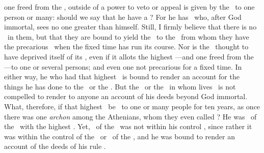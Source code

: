 \documentclass[12pt,twoside]{memoir}
\begin{document}
one freed from the \leges, outside of
a power to veto or appeal is given by the \populus\ to one person or
many: should we say that he  have a \iusmaiestatis?
For he has \maiestas\ who, after God immortal, sees no one greater
than himself.  Still, I firmly believe  that there is
no \maiestas\ in them, but that they are bound to yield
 the \imperium\ to the \populus\ from whom they have
the precarious \potestas\ when the fixed time has run its
course. %
Nor is the \populus\ thought to have deprived itself of its \potestas,
even if it allots the highest \imperium---and one freed from the
\leges---to one or several persons; and even one not precarious
for a fixed time. In either way, he who had that highest \imperium\
is bound to render an account for the things he has done
to the \princeps\ or the \populus.
But the \princeps\ or the \populus\ in whom lives 
\maiestas\ is not compelled to render to anyone an account of his
\additio{or its} deeds beyond God immortal.
%
What, therefore, if that highest \imperium\ be \concederi\ to one or
many people for ten years, as once there was one \emph{archon} among
the Athenians, whom they even called \Iudex? He was \praeesse\ of the
\respublica\ with the highest \potestas. Yet, \maiestas\ of the
\respublica\ was not within his control , since
rather it was within the control of the \curator\ or \procurator\ of
the \populus, and he was bound to render an account of the deeds of
his rule \platin{imperii gesti}.




\end{document}
